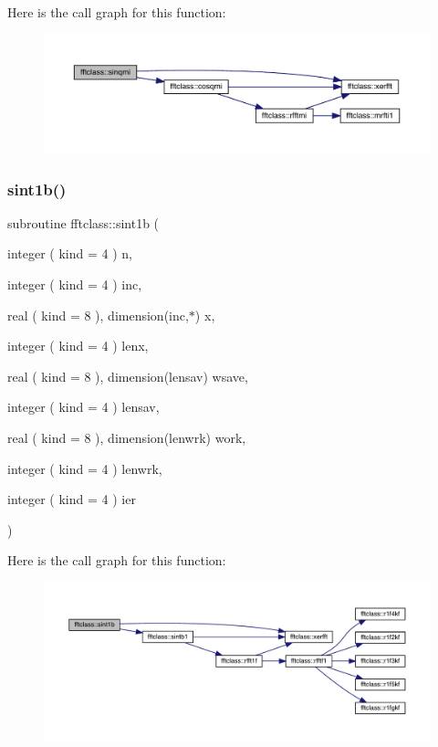 Here is the call graph for this function\+:\nopagebreak
\begin{figure}[H]
\begin{center}
\leavevmode
\includegraphics[width=350pt]{namespacefftclass_a642a9e3f241f3aaa6baf58741d4cdd3b_cgraph}
\end{center}
\end{figure}
\mbox{\label{namespacefftclass_ada18e37204cdb55b83be98eaecc27730}} 
\subsubsection{\texorpdfstring{sint1b()}{sint1b()}}
{\footnotesize\ttfamily subroutine fftclass\+::sint1b (\begin{DoxyParamCaption}\item[{integer ( kind = 4 )}]{n,  }\item[{integer ( kind = 4 )}]{inc,  }\item[{real ( kind = 8 ), dimension(inc,$\ast$)}]{x,  }\item[{integer ( kind = 4 )}]{lenx,  }\item[{real ( kind = 8 ), dimension(lensav)}]{wsave,  }\item[{integer ( kind = 4 )}]{lensav,  }\item[{real ( kind = 8 ), dimension(lenwrk)}]{work,  }\item[{integer ( kind = 4 )}]{lenwrk,  }\item[{integer ( kind = 4 )}]{ier }\end{DoxyParamCaption})}

Here is the call graph for this function\+:\nopagebreak
\begin{figure}[H]
\begin{center}
\leavevmode
\includegraphics[width=350pt]{namespacefftclass_ada18e37204cdb55b83be98eaecc27730_cgraph}
\end{center}
\end{figure}
\mbox{\label{namespacefftclass_a6ae22ff215b2e962b410eb1b9c4860d7}} 

